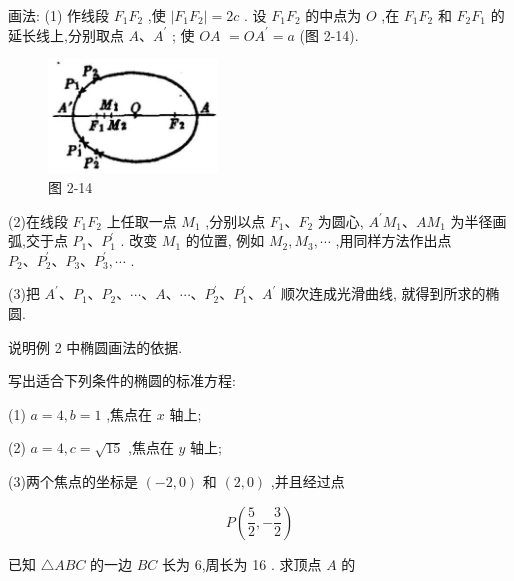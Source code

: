 \documentclass[lang=cn,newtx,10.5pt,scheme=chinese]{elegantbook}
\begin{document}
画法: (1) 作线段 \({F}_{1}{F}_{2}\) ,使 \(\left| {{F}_{1}{F}_{2}}\right| = {2c}\) . 设 \({F}_{1}{F}_{2}\) 的中点为 \(O\) ,在 \({F}_{1}{F}_{2}\) 和 \({F}_{2}{F}_{1}\) 的延长线上,分别取点 \(A\text{、}{A}^{\prime }\) ; 使 \({OA}\) \(= O{A}^{\prime } = a\) (图 2-14).

\begin{figure}[h]
  \centering
  \includegraphics[max width=0.4\textwidth]{images/01912cc2-ffb6-728e-9ae7-b113ff05c64b_89_799031.jpg}
  \caption{图 2-14}
\end{figure}



(2)在线段 \({F}_{1}{F}_{2}\) 上任取一点 \({M}_{1}\) ,分别以点 \({F}_{1}\text{、}{F}_{2}\) 为圆心, \({A}^{\prime }{M}_{1}\text{、}A{M}_{1}\) 为半径画弧,交于点 \({P}_{1}\text{、}{P}_{1}^{\prime }\) . 改变 \({M}_{1}\) 的位置, 例如 \({M}_{2},{M}_{3},\cdots\) ,用同样方法作出点 \({P}_{2}\text{、}{P}_{2}^{\prime }\text{、}{P}_{3}\text{、}{P}_{3}^{\prime },\cdots\) .

(3)把 \({A}^{\prime }\text{、}{P}_{1}\text{、}{P}_{2}\text{、}\cdots \text{、}A\text{、}\cdots \text{、}{P}_{2}^{\prime }\text{、}{P}_{1}^{\prime }\text{、}{A}^{\prime }\) 顺次连成光滑曲线, 就得到所求的椭圆.

\begin{problemset}[练习]

\item 说明例 2 中椭圆画法的依据.

\item 写出适合下列条件的椭圆的标准方程:

(1) \(a = 4,b = 1\) ,焦点在 \(x\) 轴上;

(2) \(a = 4,c = \sqrt{15}\) ,焦点在 \(y\) 轴上;

(3)两个焦点的坐标是 \(\left( {-2,0}\right)\) 和 \(\left( {2,0}\right)\) ,并且经过点

\[
  P\left( {\frac{5}{2}, - \frac{3}{2}}\right)
\]

\item 已知 \(\bigtriangleup {ABC}\) 的一边 \({BC}\) 长为 6,周长为 16 . 求顶点 \(A\) 的

\end{problemset}
\end{document}
